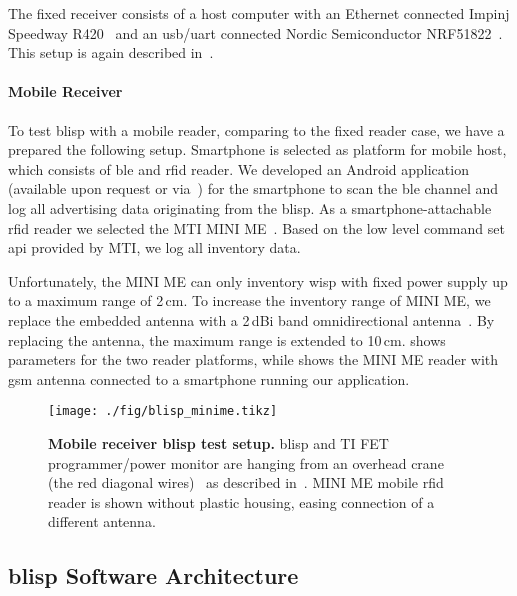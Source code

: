 \documentclass[conference,letterpaper,twoside,final,10pt]{IEEEtran}
\begin{document}
The fixed receiver consists of a host computer with an Ethernet connected Impinj Speedway R420~\cite{impinj2014r420} and an \acs{usb}/\acs{uart} connected Nordic Semiconductor NRF51822~\cite{nordic2012nrf51822}.
This setup is again described in~.

\paragraph{Mobile Receiver}
\label{sec:blisp/minime}

To test \ac{blisp} with a mobile reader, comparing to the fixed reader case, we have a prepared the following setup.
Smartphone is selected as platform for mobile host, which consists of \ac{ble} and \ac{rfid} reader.
We developed an Android application (available upon request or via~\cite{blisp2015repo}) for the smartphone to scan the \ac{ble} channel and log all advertising data originating from the \ac{blisp}.
As a smartphone-attachable \ac{rfid} reader we selected the MTI MINI ME~\cite{mti2015minime}. Based on the low level command set \ac{api} provided by MTI, we log all inventory data.

Unfortunately, the MINI ME can only inventory \ac{wisp} with fixed power supply up to a maximum range of 2\,\si{\centi\metre}.
To increase the inventory range of MINI ME, we replace the embedded antenna with a 2\,\si{dBi}  band omnidirectional antenna~\cite{adafruit2015antenna}.
By replacing the antenna, the maximum range is extended to 10\,\si{\centi\metre}.
 shows parameters for the two reader platforms, while
 shows the MINI ME reader with \ac{gsm} antenna connected to a smartphone running our application.

\begin{figure}
	\centering
	\texttt{[image: ./fig/blisp\_minime.tikz]}
	\caption{\textbf{Mobile receiver \ac{blisp} test setup.}
	\ac{blisp} and TI FET programmer/power monitor are hanging from an overhead crane (the red diagonal wires)~\cite{catani2015gondola} as described in~.
	MINI ME mobile \ac{rfid} reader is shown without plastic housing, easing connection of a different antenna.
	}
	\label{fig:minime_experiment}
\end{figure}

\subsection{\acs{blisp} Software Architecture}
\label{sec:blisp_software}
\end{document}
